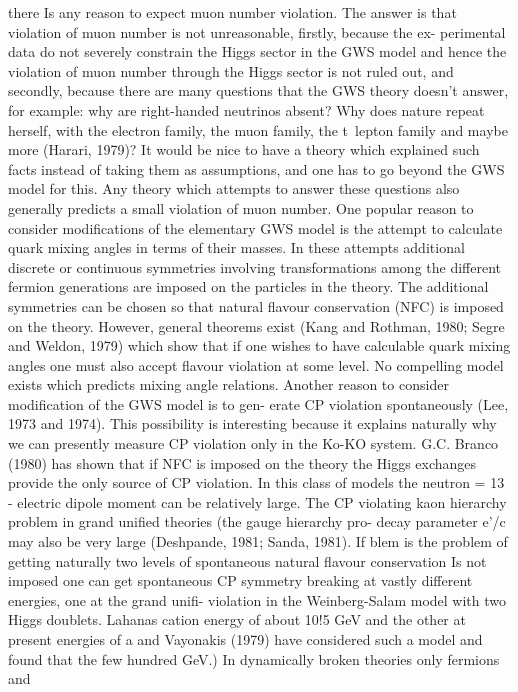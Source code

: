 \documentclass[twoside]{article}
\begin{document}
{there Is any reason to expect muon number violation. The answer is that
violation of muon number is not unreasonable, firstly, because the ex-
perimental data do not severely constrain the Higgs sector in the GWS
model and hence the violation of muon number through the Higgs sector is
not ruled out, and secondly, because there are many questions that the
GWS theory doesn't answer, for example: why are right-handed neutrinos
absent? Why does nature repeat herself, with the electron family, the
muon family, the t~lepton family and maybe more (Harari, 1979)? It
would be nice to have a theory which explained such facts instead of
taking them as assumptions, and one has to go beyond the GWS model for
this. Any theory which attempts to answer these questions also generally
predicts a small violation of muon number.
One popular reason to consider modifications of the elementary GWS
model is the attempt to calculate quark mixing angles in terms of their
masses. In these attempts additional discrete or continuous symmetries
involving transformations among the different fermion generations are
imposed on the particles in the theory. The additional symmetries can
be chosen so that natural flavour conservation (NFC) is imposed on the
theory. However, general theorems exist (Kang and Rothman, 1980; Segre
and Weldon, 1979) which show that if one wishes to have calculable quark
mixing angles one must also accept flavour violation at some level. No
compelling model exists which predicts mixing angle relations.
Another reason to consider modification of the GWS model is to gen-
erate CP violation spontaneously (Lee, 1973 and 1974). This possibility
is interesting because it explains naturally why we can presently
measure CP violation only in the Ko-KO system. G.C. Branco (1980) has
shown that if NFC is imposed on the theory the Higgs exchanges provide
the only source of CP violation. In this class of models the neutron
 = 13 -
electric dipole moment can be relatively large. The CP violating kaon hierarchy problem in grand unified theories (the gauge hierarchy pro-
decay parameter e'/c may also be very large (Deshpande, 1981; Sanda, 1981). If blem is the problem of getting naturally two levels of spontaneous
natural flavour conservation Is not imposed one can get spontaneous CP symmetry breaking at vastly different energies, one at the grand unifi-
violation in the Weinberg-Salam model with two Higgs doublets. Lahanas cation energy of about 10!5 GeV and the other at present energies of a
and Vayonakis (1979) have considered such a model and found that the few hundred GeV.) In dynamically broken theories only fermions and
}
\end{document}
